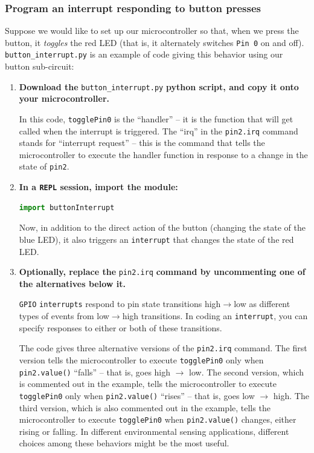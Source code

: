 \subsubsection{\howto Program an interrupt responding to button presses}
Suppose we would like to set up our microcontroller so that, when we press the button, it \emph{toggles} the red LED (that is, it alternately switches \texttt{Pin 0} on and off). \verb|button_interrupt.py| is an example of code giving this behavior using our button sub-circuit:
\begin{enumerate}
	\item \textbf{Download the} \lstinline{button_interrupt.py} \textbf{python script, and copy it onto your microcontroller.}
	
	In this code, \lstinline{togglePin0} is the ``handler'' -- it is the function that will get called when the interrupt is triggered.
	The ``irq'' in the \lstinline{pin2.irq} command stands for ``interrupt request'' -- this is the command that tells the microcontroller to execute the handler function in response to a change in the state of \lstinline{pin2}.

	\item \textbf{In a \texttt{REPL} session, import the module:}
\begin{lstlisting}[language=Python]
import buttonInterrupt
\end{lstlisting}
	Now, in addition to the direct action of the button (changing the state of the blue LED), it also triggers an \texttt{interrupt} that changes the state of the red LED.
	\item \textbf{Optionally, replace the} \lstinline{pin2.irq} \textbf{command by uncommenting one of the alternatives below it.}

	\texttt{GPIO} \texttt{interrupts} respond to pin state transitions high$\rightarrow$low as different types of events from low$\rightarrow$high transitions.
	In coding an \texttt{interrupt}, you can specify responses to either or both of these transitions.

	\smallskip
	The code gives three alternative versions of the \lstinline{pin2.irq} command.
	The first version tells the microcontroller to execute \lstinline{togglePin0} only when \lstinline{pin2.value()} ``falls'' -- that is, goes high $\rightarrow$ low.
	The second version, which is commented out in the example, tells the microcontroller to execute \lstinline{togglePin0} only when \lstinline{pin2.value()} ``rises'' -- that is, goes low $\rightarrow$ high.
	The third version, which is also commented out in the example, tells the microcontroller to execute \lstinline{togglePin0} when \lstinline{pin2.value()} changes, either rising or falling.
	In different environmental sensing applications, different choices among these behaviors might be the most useful.


\end{enumerate}
